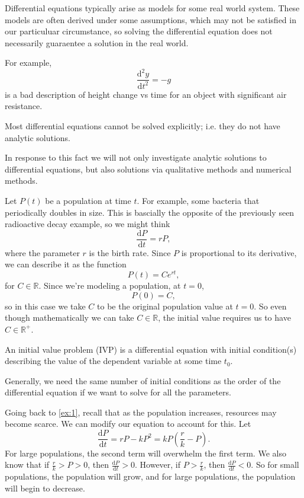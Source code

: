 \begin{note}
	Differential equations typically arise as models for some real world system. These models are often derived under some assumptions, which may not be satisfied in our particuluar circumstance, so solving the differential equation does not necessarily guaraentee a solution in the real world.
\end{note}

For example,
\[
	\frac{\mathrm{d}^2y}{\mathrm{d}t^2} =-g
\]
is a bad description of height change vs time for an object with significant air resistance.

\begin{remark}
	Most differential equations cannot be solved explicitly; i.e. they do not have analytic solutions.
\end{remark}
In response to this fact we will not only investigate analytic solutions to differential equations, but also solutions via qualitative methods and numerical methods.

\begin{example}\label{ex:1}
	Let $P(t)$ be a population at time $t$. For example, some bacteria that periodically doubles in size. This is bascially the opposite of the previously seen radioactive decay example, so we might think
	\[
		\frac{\mathrm{d}P}{\mathrm{d}t} =rP
	,\]
	where the parameter $r$ is the birth rate. Since $P$ is proportional to its derivative, we can describe it as the function
	\[
		P(t)=Ce^{rt}
	,\]
	 for $C\in\mathbb{R}$. Since we're modeling a population, at $t=0$,
	 \[
	 	P(0)=C
	 ,\]
	 so in this case we take $C$ to be the original population value at $t=0$. So even though mathematically we can take $C\in\mathbb{R}$, the initial value requires us to have $C\in\mathbb{R}^+$.
\end{example}
\begin{definition}\label{dfn:3}
	An initial value problem (IVP) is a differential equation with initial condition(s) describing the value of the dependent variable at some time $t_0$.

	Generally, we need the same number of initial conditions as the order of the differential equation if we want to solve for all the parameters.
\end{definition}
Going back to \ref{ex:1}, recall that as the population increases, resources may become scarce. We can modify our equation to account for this. Let
\[
	\frac{\mathrm{d}P}{\mathrm{d}t} =rP-kP^2 = kP\left( \frac{r}{k}-P \right) 
.\]
For large populations, the second term will overwhelm the first term. We also know that if $\frac{r}{k}>P>0$, then $\frac{\mathrm{d}P}{\mathrm{d}t} >0$. However, if $P>\frac{r}{k}$, then $\frac{\mathrm{d}P}{\mathrm{d}t} <0$. So for small populations, the population will grow, and for large populations, the population will begin to decrease.

